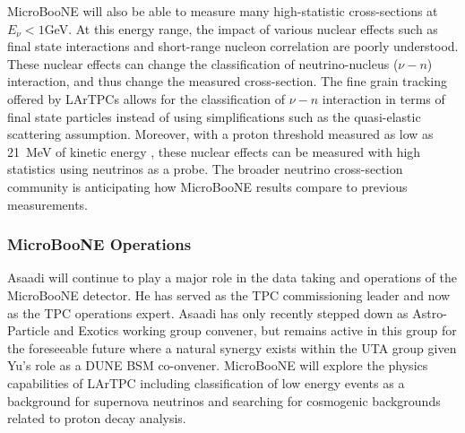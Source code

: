 MicroBooNE will also be able to measure many high-statistic cross-sections at $E_{\nu} < 1$GeV. At this energy range, the impact of various nuclear effects such as final state interactions and short-range nucleon correlation are poorly understood. These nuclear effects can change the classification of neutrino-nucleus ($\nu-n$) interaction, and thus change the measured cross-section. The fine grain tracking offered by LArTPCs allows for the classification of $\nu-n$ interaction in terms of final state particles instead of using simplifications such as the quasi-elastic scattering assumption. Moreover, with a proton threshold measured as low as 21~MeV of kinetic energy \cite{Argoneut}, these nuclear effects can be measured with high statistics using neutrinos as a probe. The broader neutrino cross-section community is anticipating how MicroBooNE results compare to previous measurements.


\subsubsection{MicroBooNE Operations}\label{sec:UbooneOperations}
Asaadi will continue to play a major role in the data taking and operations of the MicroBooNE detector.  He has served as the TPC commissioning leader and now as the TPC operations expert. Asaadi has only recently stepped down as Astro-Particle and Exotics working group convener, but remains active in this group for the foreseeable future where a natural synergy exists within the UTA group given Yu's role as a DUNE BSM co-onvener. MicroBooNE will explore the physics capabilities of LArTPC including classification of low energy events as a background for supernova neutrinos and searching for cosmogenic backgrounds related to proton decay analysis.

